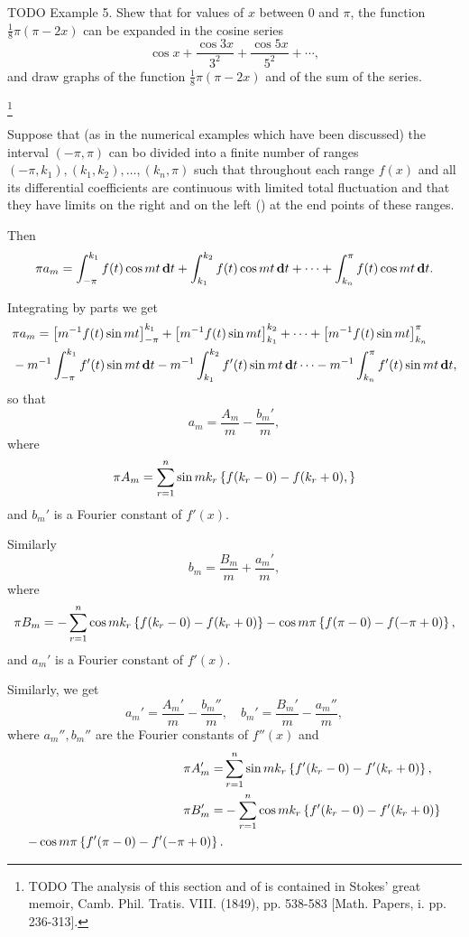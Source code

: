 TODO Example 5. Shew that for values of $x$ between $0$ and $\pi$,
the function $\frac{1}{8} \pi (\pi - 2x)$ can
be expanded in the cosine series
$$
\cos x
+ \frac{\cos 3x}{3^{2}}
+ \frac{\cos 5x}{5^{2}}
+ \cdots,
$$
and draw graphs of the function $\frac{1}{8} \pi (\pi - 2x)$ and of the sum of the
series.

\footnote{TODO The analysis of this section and of is contained in Stokes'
great memoir, Camb. Phil. Tratis. VIII. (1849), pp. 538-583 [Math.
Papers, i. pp. 236-313].}

Suppose that (as in the numerical examples which have been discussed)
the interval $(-\pi, \pi)$ can bo divided into a finite number of ranges
$(-\pi, k_{1}), (k_{1}, k_{2}), \ldots, (k_{n}, \pi)$
such that throughout each range $f(x)$
and all its differential coefficients are continuous with limited
total fluctuation and that they have limits on the right and on the
left () at the end points of these ranges.

Then
$$
\pi a_{m}
=
\int_{-\pi}^{k_{1}} f(t) \cos mt \, \mathbf{d} t
+ \int_{k_{1}}^{k_{2}} f(t) \cos mt \, \mathbf{d} t
+ \cdots
+ \int_{k_{n}}^{\pi} f(t) \cos mt \, \mathbf{d} t.
$$

Integrating by parts we get
\begin{align*}
  &
  \pi a_{m}
  =
  \thebracket{
    m^{-1} f(t) \sin mt
  }_{-\pi}^{k_{1}}
  +
  \thebracket{
    m^{-1} f(t) \sin mt
  }_{k_{1}}^{k_{2}}
  +
  \cdots
  +
  \thebracket{
    m^{-1} f(t) \sin mt
  }_{k_{n}}^{\pi}
  \\
  & \hfill
  - m^{-1} \int_{-\pi}^{k_{1}} f'(t) \sin mt \dmeasure t
  - m^{-1} \int_{k_{1}}^{k_{2}} f'(t) \sin mt \dmeasure t
  \cdots
  - m^{-1} \int_{k_{n}}^{\pi} f'(t) \sin mt \dmeasure t,
\end{align*}
so that
$$
a_{m} = \frac{A_{m}}{m} - \frac{b_{m}'}{m},
$$
%
%
where
$$
\pi A_{m}
=
\sum_{r=1}^{n}
\sin m k_{r}
\left\{ 
  f(k_{r} - 0) - f(k_{r} + 0),
 \right\}
$$
and $b_{m}'$ is a Fourier constant of $f'(x)$.

Similarly
$$
b_{m} = \frac{B_{m}}{m} + \frac{a_{m}'}{m},
$$
where
$$
\pi B_{m}
=
-
\sum_{r=1}^{n}
\cos m k_{r}
\left\{ 
  f(k_{r} - 0)
  -
  f(k_{r} + 0)
 \right\}
-
\cos m \pi
\left\{ 
  f(\pi - 0)
  -
  f(-\pi + 0)
 \right\}
,
$$
and $a_{m}'$ is a Fourier constant of $f'(x)$.

Similarly, we get
$$
a_{m}' = \frac{A_{m}'}{m} - \frac{b_{m}''}{m},
\quad
b_{m}' = \frac{B_{m}'}{m} - \frac{a_{m}''}{m},
$$
where $a_{m}'', b_{m}''$ are the Fourier constants of
$f''(x)$ and
\begin{align*}
  \pi A_{m}'
  =&
  \sum_{r=1}^{n} \sin m k_{r} \thebrace{
    f'(k_{r}-0) - f'(k_{r}+0)
  },
  \\
  \pi B_{m}'
  =&
  - \sum_{r=1}^{n} \cos m k_{r} \thebrace{
    f'(k_{r}-0) - f'(k_{r}+0)
  }
  \\
  \hfill
  - \cos m \pi \thebrace{
    f'(\pi - 0) - f'(-\pi + 0)
  }.
\end{align*}

